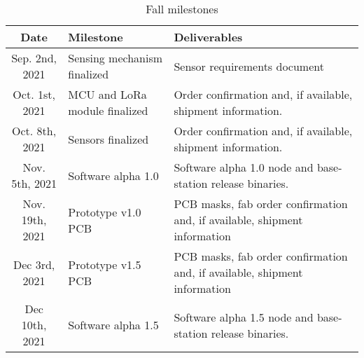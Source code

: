 \begin{table}[H]
    
    \begin{tabularx}{\linewidth}{|c|X|X|}
        \hline
        Date & Milestone & Deliverables \\
        \hline\hline
        Sep. 2nd, 2021 
        & Sensing mechanism finalized 
        & Sensor requirements document \\
        
        \hline
        Oct. 1st, 2021
        & MCU and LoRa module finalized
        & Order confirmation and, if available, shipment information. \\
        
        \hline
        Oct. 8th, 2021 
        & Sensors finalized 
        & Order confirmation and, if available, shipment information. \\
        
        \hline
        Nov. 5th, 2021 
        & Software alpha 1.0 
        & Software alpha 1.0 node and base-station release binaries. \\ 
        
        \hline
        Nov. 19th, 2021 & Prototype v1.0 PCB 
        & PCB masks, fab order confirmation and, if available, shipment information \\
        
        \hline
        Dec 3rd, 2021 & Prototype v1.5 PCB 
        & PCB masks, fab order confirmation and, if available, shipment information \\
        
        \hline
        Dec 10th, 2021 
        & Software alpha 1.5 
        & Software alpha 1.5 node and base-station release binaries. \\ 
        
        \hline
    \end{tabularx}
    \caption{Fall milestones}
    \label{fall-milestones}
\end{table}

